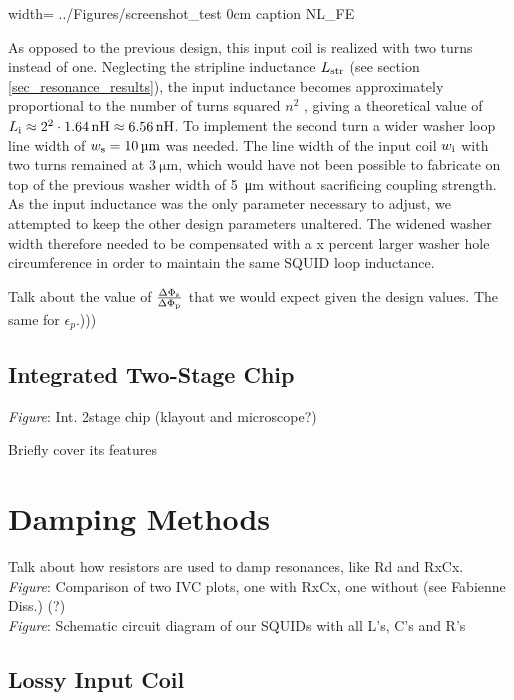 {width=\textwidth}
{../Figures/screenshot_test}
{0cm}
{caption} 
{NL_FE}

As opposed to the previous design, this input coil is realized with two turns instead of one. Neglecting the stripline inductance $L_{\rm str}$ (see section \ref{sec_resonance_results}), the input inductance becomes approximately proportional to the number of turns squared $n^2$ \cite{Ketchen1981,Jaycox1981}, giving a theoretical value of $L_{\rm i}\approx2^{2}\cdot \qty{1.64}{\nano\henry}\approx\qty{6.56}{\nano\henry}$. To implement the second turn a wider washer loop line width of $w_{\rm s}=\qty{10}{\micro\meter}$ was needed. The line width of the input coil $w_{\rm i}$ with two turns remained at $\qty{3}{\micro\meter}$, which would have not been possible to fabricate on top of the previous washer width of \qty{5}{\micro\meter} without sacrificing coupling strength. As the input inductance was the only parameter necessary to adjust, we attempted to keep the other design parameters unaltered. The widened washer width therefore needed to be compensated with a x percent larger washer hole circumference in order to maintain the same SQUID loop inductance.       
  


Talk about the value of $\frac{\Delta\Phi_{\rm s}}{\Delta\Phi_{\rm p}}$ that we would expect given the design values. The same for $\epsilon_p$.)))

\subsection{Integrated Two-Stage Chip}

\textit{Figure}: Int. 2stage chip (klayout and microscope?)

Briefly cover its features

\section{Damping Methods} \label{sec_damping}

Talk about how resistors are used to damp resonances, like Rd and RxCx.\\ 
\textit{Figure}: Comparison of two IVC plots, one with RxCx, one without (see Fabienne Diss.) (?) \\
\textit{Figure}: Schematic circuit diagram of our SQUIDs with all L's, C's and R's

\subsection{Lossy Input Coil}

